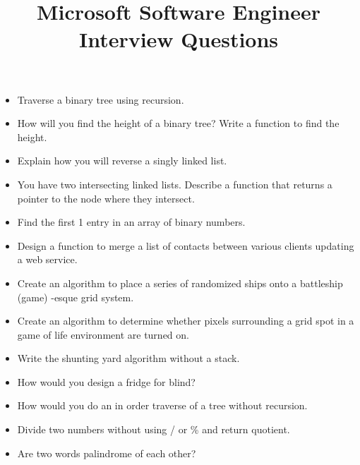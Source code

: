 \documentclass{article}
\begin{document}
\title{Microsoft Software Engineer Interview Questions}
\maketitle
\begin{itemize}
	\item Traverse a binary tree using recursion.
	\item How will you find the height of a binary tree? Write a function to find the height.
	\item Explain how you will reverse a singly linked list. 
	\item You have two intersecting linked lists. Describe a function that returns a pointer to the node where they intersect.
	\item Find the first 1 entry in an array of binary numbers.
	\item Design a function to merge a list of contacts between various clients updating a web service.
	\item Create an algorithm to place a series of randomized ships onto a battleship (game) -esque grid system.
	\item Create an algorithm to determine whether pixels surrounding a grid spot in a game of life environment are turned on.
	\item Write the shunting yard algorithm without a stack.
	\item How would you design a fridge for blind?
	\item How would you do an in order traverse of a tree without recursion.
	\item Divide two numbers without using / or \% and return quotient.
	\item Are two words palindrome of each other?
\end{itemize}
\end{document}
